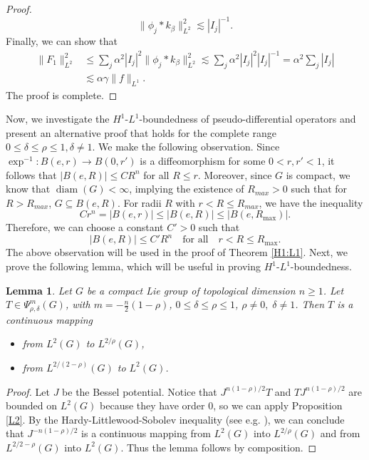 \documentclass[12pt, reqno]{amsart}
\newtheorem{lemma}[theorem]{Lemma}
\theoremstyle{definition}
\theoremstyle{remark}
\numberwithin{equation}{section}
\begin{document}
\begin{proof}
\begin{equation*}
    \|\phi_j*k_\beta\|_{L^2}^2\lesssim|I_j|^{-1}.
\end{equation*}
 Finally, we can show that
 \begin{equation*}
\begin{aligned}
    \|F_1\|^2_{L^2}&\leq\sum_{j}\alpha^2|I_j|^2\|\phi_j*k_\beta\|^2_{L^2}\lesssim\sum_{j}\alpha^2|I_j|^2|I_j|^{-1}=\alpha^2\sum_{j}|I_j|\\
    &\lesssim\alpha\gamma\|f\|_{L^1}.
\end{aligned}
 \end{equation*}The proof is complete.
\end{proof} Now, we investigate the $H^1$-$L^1$-boundedness of pseudo-differential operators and present an alternative proof that holds for the complete range $0 \leq \delta \le \rho \le 1, \delta \neq 1$. We make the following observation. Since $\exp^{-1}\colon B(e,r)\to B(0,r')$ is a diffeomorphism for some $0<r,r'<1$, it follows that $|B(e,R)|\leq CR^n$ for all $R\leq r$. Moreover, since $G$ is compact, we know that $\operatorname{diam}(G)<\infty$, implying the existence of $R_{max}>0$ such that for $R>R_{max}$, $G\subseteq B(e,R)$. For radii $R$ with $r<R\leq R_{max}$, we have the inequality
\begin{equation*}
    Cr^n = |B(e, r)| \leq |B(e, R)| \leq |B(e, R_{\max})|.
\end{equation*}
Therefore, we can choose a constant \(C' > 0\) such that
\begin{equation*}
   |B(e, R)| \leq C' R^n \quad \text{for all} \quad r < R \leq R_{\max}. 
\end{equation*}
The above observation will be used in the proof of Theorem \ref{H1:L1}. Next, we prove the following lemma, which will be useful in proving $H^1$-$L^1$-boundedness. 
\begin{lemma}
    Let $G$ be a compact Lie group of topological dimension $n\geq 1$.  Let $T\in\Psi^{m}_{\rho,\delta}(G)$, with $m=-\frac{n}{2}(1-\rho)$, $0\leq\delta\leq\rho\leq 1$, $\rho\neq0,\;$$\delta\neq 1$.
    Then $T$ is a continuous mapping
    \begin{itemize}
        \item from $L^2(G)$ to $L^{2/\rho}(G)$,
        \item from $L^{2/(2-\rho)}(G)$ to $L^{2}(G)$.
    \end{itemize}
\end{lemma}
\begin{proof}
    Let $J$ be the Bessel potential. Notice that $J^{n(1-\rho)/2}T$ and $TJ^{n(1-\rho)/2}$ are bounded on $L^2(G)$ because they have order 0, so we can apply Proposition \ref{L2}. By the Hardy-Littlewood-Sobolev inequality (see e.g. \cite{HLS}), we can conclude that $J^{-n(1-\rho)/2}$ is a continuous mapping from $L^2(G)$ into $L^{2/\rho}(G)$ and from $L^{2/2-\rho}(G)$ into $L^2(G)$. Thus the lemma follows by composition. 
\end{proof}
\end{document}
